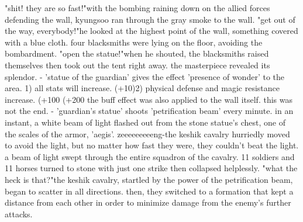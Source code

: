 "shit! they are so fast!"with the bombing raining down on the allied forces defending the wall, kyungsoo ran through the gray smoke to the wall.
"get out of the way, everybody!"he looked at the highest point of the wall, something covered with a blue cloth.
four blacksmiths were lying on the floor, avoiding the bombardment.
"open the statue!"when he shouted, the blacksmiths raised themselves then took out the tent right away.
the masterpiece revealed its splendor.
- 'statue of the guardian' gives the effect 'presence of wonder' to the area.
1) all stats will increase.
 (+10)2) physical defense and magic resistance increase.
 (+100%
 (+200%
 the buff effect was also applied to the wall itself.
 this was not the end.
- 'guardian's statue' shoots 'petrification beam' every minute.
in an instant, a white beam of light flashed out from the stone statue's chest, one of the scales of the armor, 'aegis'.
zeeeeeeeeeng-the keshik cavalry hurriedly moved to avoid the light, but no matter how fast they were, they couldn't beat the light.
 a beam of light swept through the entire squadron of the cavalry.
11 soldiers and 11 horses turned to stone with just one strike then collapsed helplessly.
"what the heck is that?"the keshik cavalry, startled by the power of the petrification beam, began to scatter in all directions.
 then, they switched to a formation that kept a distance from each other in order to minimize damage from the enemy's further attacks.

